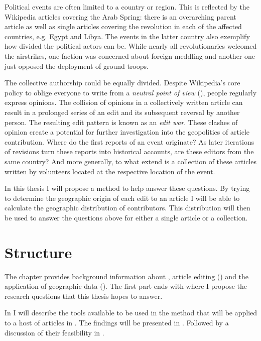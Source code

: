 Political events are often limited to a country or region. 
This is reflected by the Wikipedia articles covering the Arab Spring: there is an overarching parent article as well as single articles covering the revolution in each of the affected countries, e.g. Egypt and Libya.
The events in the latter country also exemplify how divided the political actors can be.
While nearly all revolutionaries welcomed the airstrikes, one faction was concerned about foreign meddling and another one just opposed the deployment of ground troops.\cite{econ18290470}

The collective authorship could be equally divided.
Despite Wikipedia's core policy to oblige everyone to write from a \emph{neutral point of view} (), people regularly express opinions. 
The collision of opinions in a collectively written article can result in a prolonged series of an edit and its subsequent reversal by another person. 
The resulting edit pattern is known as an \emph{edit war}.\cite{suh2007us}
These clashes of opinion create a potential for further investigation into the geopolitics of article contribution.
Where do the first reports of an event originate?
As later iterations of revisions turn these reports into historical accounts, are these editors from the same country?
And more generally, to what extend is a collection of these articles written by volunteers located at the respective location of the event.

In this thesis I will propose a method to help answer these questions.
By trying to determine the geographic origin of each edit to an article I will be able to calculate the geographic distribution of contributors.
This distribution will then be used to answer the questions above for either a single article or a collection.


\section{Structure}


The chapter  provides background information about , article editing () and the application of geographic data ().
The first part ends with  where I propose the research questions that this thesis hopes to answer.

In  I will describe the tools available to be used in the method that will be applied to a host of articles in .
The findings will be presented in .
Followed by a discussion of their feasibility in .